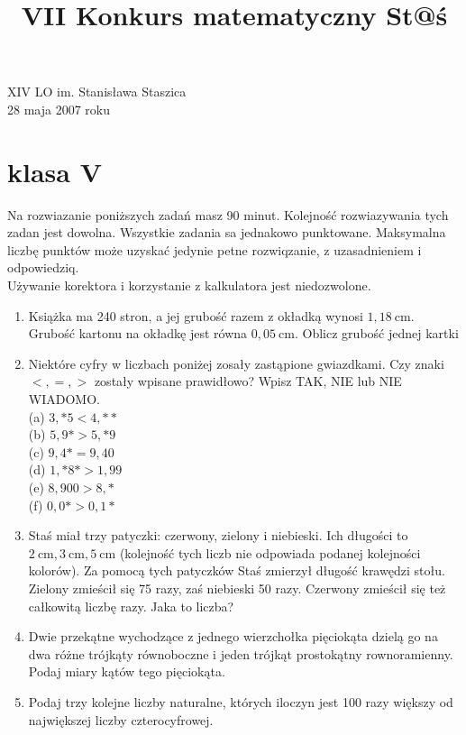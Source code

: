 \documentclass[10pt]{article}
\title{VII Konkurs matematyczny St@ś }
\author{}
\date{}
\begin{document}
\maketitle
XIV LO im. Stanisława Staszica\\
28 maja 2007 roku

\section*{klasa V}
Na rozwiazanie poniższych zadań masz 90 minut. Kolejność rozwiazywania tych zadan jest dowolna. Wszystkie zadania sa jednakowo punktowane. Maksymalna liczbę punktów może uzyskać jedynie petne rozwiqzanie, z uzasadnieniem i odpowiedziq.\\
Używanie korektora i korzystanie z kalkulatora jest niedozwolone.

\begin{enumerate}
  \item Książka ma 240 stron, a jej grubość razem z okładką wynosi \(1,18 \mathrm{~cm}\). Grubość kartonu na okładkę jest równa \(0,05 \mathrm{~cm}\). Oblicz grubość jednej kartki
  \item Niektóre cyfry w liczbach poniżej zosały zastąpione gwiazdkami. Czy znaki \(<,=,>\) zostały wpisane prawidłowo? Wpisz TAK, NIE lub NIE WIADOMO.\\
(a) \(3, * 5<4, * *\)\\
(b) \(5,9 *>5, * 9\)\\
(c) \(9,4 *=9,40\)\\
(d) \(1, * 8 *>1,99\)\\
(e) \(8,900>8, *\)\\
(f) \(0,0 *>0,1 *\)
  \item Staś miał trzy patyczki: czerwony, zielony i niebieski. Ich długości to \(2 \mathrm{~cm}, 3 \mathrm{~cm}, 5 \mathrm{~cm}\) (kolejność tych liczb nie odpowiada podanej kolejności kolorów). Za pomocą tych patyczków Staś zmierzył długość krawędzi stołu. Zielony zmieścił się 75 razy, zaś niebieski 50 razy. Czerwony zmieścił się też całkowitą liczbę razy. Jaka to liczba?
  \item Dwie przekątne wychodzące z jednego wierzchołka pięciokąta dzielą go na dwa różne trójkąty równoboczne i jeden trójkąt prostokątny rownoramienny. Podaj miary kątów tego pięciokąta.
  \item Podaj trzy kolejne liczby naturalne, których iloczyn jest 100 razy większy od największej liczby czterocyfrowej.
\end{enumerate}
\end{document}
